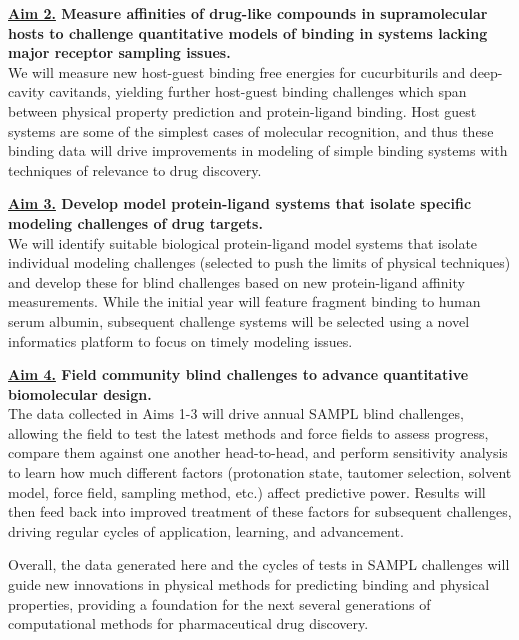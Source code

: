\documentclass[11pt]{article}
\begin{document}
{\bf \underline{Aim 2.} Measure affinities of drug-like compounds in supramolecular hosts to challenge quantitative models of binding in systems lacking major receptor sampling issues.}\\
We will measure new host-guest binding free energies for cucurbiturils and deep-cavity cavitands, yielding further host-guest binding challenges which span between physical property prediction and protein-ligand binding. 
Host guest systems are some of the simplest cases of molecular recognition, and thus these binding data will drive improvements in modeling of simple binding systems with techniques of relevance to drug discovery.

{\bf \underline{Aim 3.} Develop model protein-ligand systems that isolate specific modeling challenges of drug targets.}\\
We will identify suitable biological protein-ligand model systems that isolate individual modeling challenges (selected to push the limits of physical techniques) and develop these for blind challenges based on new protein-ligand affinity measurements.
While the initial year will feature fragment binding to human serum albumin, subsequent challenge systems will be selected using a novel informatics platform to focus on timely modeling issues.

{\bf \underline{Aim 4.} Field community blind challenges to advance quantitative biomolecular design.} \\
The data collected in Aims 1-3 will drive annual SAMPL blind challenges, allowing the field to test the latest methods and force fields to assess progress, compare them against one another head-to-head, and perform sensitivity analysis to learn how much different factors (protonation state, tautomer selection, solvent model, force field, sampling method, etc.) affect predictive power. 
Results will then feed back into improved treatment of these factors for subsequent challenges, driving regular cycles of application, learning, and advancement.

Overall, the data generated here and the cycles of tests in SAMPL challenges will guide new innovations in physical methods for predicting binding and physical properties, providing a foundation for the next several generations of computational methods for pharmaceutical drug discovery. 
\end{document}
